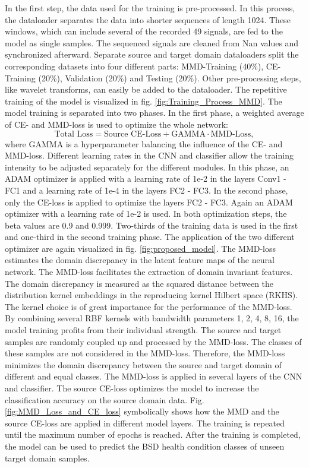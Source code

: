 In the first step, the data used for the training is pre-processed. In this process, the dataloader separates the data into shorter sequences of length 1024. These windows, which can include several of the recorded 49 signals, are fed to the model as single samples. The sequenced signals are cleaned from Nan values and synchronized afterward. Separate source and target domain dataloaders split the corresponding datasets into four different parts: MMD-Training (40\%), CE-Training (20\%), Validation (20\%) and Testing (20\%). Other pre-processing steps, like wavelet transforms, can easily be added to the dataloader. The repetitive training of the model is visualized in fig. \ref{fig:Training_Process_MMD}. The model training is separated into two phases. In the first phase, a weighted average of CE- and MMD-loss is used to optimize the whole network: 
\begin{equation}
    \mbox{Total Loss} = \mbox{Source CE-Loss} + \mbox{GAMMA} \cdot \mbox{MMD-Loss}, 
\end{equation}
where GAMMA is a hyperparameter balancing the influence of the CE- and MMD-loss. Different learning rates in the CNN and classifier allow the training intensity to be adjusted separately for the different modules. In this phase, an ADAM optimizer is applied with a learning rate of 1e-2 in the layers Conv1 - FC1 and a learning rate of 1e-4 in the layers FC2 - FC3. In the second phase, only the CE-loss is applied to optimize the layers FC2 - FC3. Again an ADAM optimizer with a learning rate of 1e-2 is used. In both optimization steps, the beta values are 0.9 and 0.999. Two-thirds of the training data is used in the first and one-third in the second training phase. The application of the two different optimizer are again visualized in fig. \ref{fig:proposed_model}. The MMD-loss estimates the domain discrepancy in the latent feature maps of the neural network. The MMD-loss facilitates the extraction of domain invariant features. The domain discrepancy is measured as the squared distance between the distribution kernel embeddings in the reproducing kernel Hilbert space (RKHS). The kernel choice is of great importance for the performance of the MMD-loss. By combining several RBF kernels with bandwidth parameters 1, 2, 4, 8, 16, the model training profits from their individual strength. The source and target samples are randomly coupled up and processed by the MMD-loss. The classes of these samples are not considered in the MMD-loss. Therefore, the MMD-loss minimizes the domain discrepancy between the source and target domain of different and equal classes. The MMD-loss is applied in several layers of the CNN and classifier. The source CE-loss optimizes the model to increase the classification accuracy on the source domain data. Fig. \ref{fig:MMD_Loss_and_CE_loss} symbolically shows how the MMD and the source CE-loss are applied in different model layers. The training is repeated until the maximum number of epochs is reached. After the training is completed, the model can be used to predict the BSD health condition classes of unseen target domain samples. 



